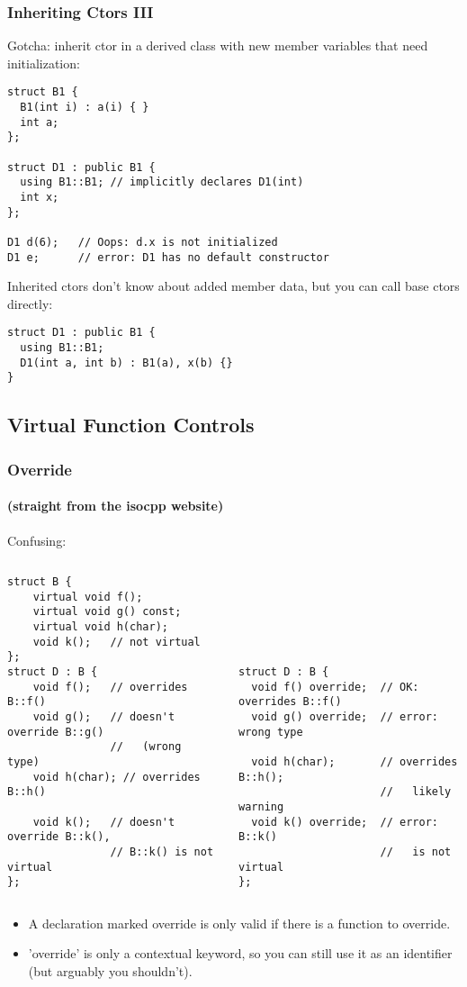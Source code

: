 \begin{frame}[fragile]
\frametitle{Inheriting Ctors III}
Gotcha: inherit ctor in a derived class with new member variables that
need initialization:

{\scriptsize
\begin{verbatim}
struct B1 {
  B1(int i) : a(i) { }
  int a;
};

struct D1 : public B1 {
  using B1::B1; // implicitly declares D1(int)
  int x;
};

D1 d(6);   // Oops: d.x is not initialized
D1 e;      // error: D1 has no default constructor
\end{verbatim}
}

Inherited ctors don't know about added member data, but you can call
base ctors directly:
{\scriptsize
\begin{verbatim}
struct D1 : public B1 {
  using B1::B1;
  D1(int a, int b) : B1(a), x(b) {}
}
\end{verbatim}
}

\end{frame}

\subsection{Virtual Function Controls}

\begin{frame}[fragile]
\frametitle{Override}
\framesubtitle{(straight from the isocpp website)}
Confusing:
\begin{columns}[t]
{\scriptsize
\begin{verbatim}
struct B {
    virtual void f();
    virtual void g() const;
    virtual void h(char);
    void k();   // not virtual
};
struct D : B {
    void f();   // overrides B::f()
    void g();   // doesn't override B::g()
                //   (wrong type)
    void h(char); // overrides B::h()

    void k();   // doesn't override B::k(),
                // B::k() is not virtual
};
\end{verbatim}
}
\pause{}
{\scriptsize
\begin{verbatim}






struct D : B {
  void f() override;  // OK: overrides B::f()
  void g() override;  // error: wrong type

  void h(char);       // overrides B::h();
                      //   likely warning
  void k() override;  // error: B::k()
                      //   is not virtual
};
\end{verbatim}
}
\end{columns}
\pause{}
\begin{itemize}
\item A declaration marked override is only valid if there is a function to override.
\item 'override' is only a contextual keyword, so you can still use it
  as an identifier (but arguably you shouldn't).
\end{itemize}
\end{frame}


